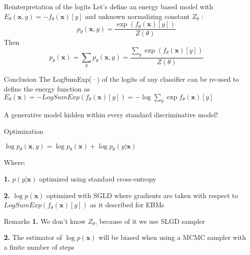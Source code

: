 \documentclass{beamer}
\begin{document}
\begin{frame}{ Reinterpretation of the logits}
    Let's define an energy based model with $E_{\theta}(\mathbf{x},y) = - f_{\theta}(\mathbf{x})[y]$ and unknown normalizing constant $Z_{\theta}$ :
    $$p_{\theta}(\mathbf{x}, y) = \frac{\exp{(f_{\theta}(\mathbf{x})[y])}}{Z(\theta)}$$
    Then 
    $$p_{\theta}(\mathbf{x}) = \sum_{y}p_{\theta}(\mathbf{x}, y) = \frac{\sum_{y}{\exp{(f_{\theta}(\mathbf{x})[y])}}}{Z(\theta)}$$
    \begin{block}{Conclusion}
        The LogSumExp(·) of the logits of any classifier can be re-used to define the energy function as $E_{\theta}(\mathbf{x}) = −LogSumExp(f_{\theta}(\mathbf{x})[y]) = -\log \sum_{y}{\exp{f_{\theta}(\mathbf{x})[y] }}$ 
        
        A generative model hidden within every standard discriminative model! 
    \end{block}
\end{frame}

\begin{frame}{Optimization}
    \begin{block}
        $\log p_{\theta}(\mathbf{x}, y) = \log p_{\theta}(\mathbf{x}) + \log p_{\theta}(y|\mathbf{x})$
       
        Where:
        
        \textbf{1.}  $p(y|\mathbf{x})$ optimized using standard cross-entropy
        
        \textbf{2.}  $\log p(\mathbf{x})$ optimized with SGLD where gradients are taken with respect to $LogSumExp(f_{\theta}(\mathbf{x})[y])$ as it described for EBMs
    \end{block}
    \begin{block}{Remarks}
            \textbf{1.}  We don't know $Z_{\theta}$, because of it we use SLGD sampler
            
            \textbf{2.}  The estimator of $\log p(\mathbf{x})$ will be biased when using a MCMC sampler with a finite number of steps
    \end{block}
\end{frame}
\end{document}
